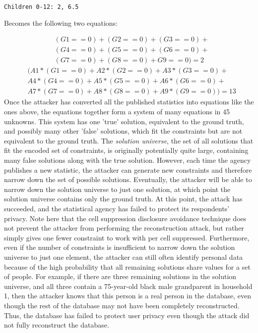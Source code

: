 \documentclass[jou,apacite]{apa6}
\begin{document}
\begin{verbatim}
Children 0-12: 2, 6.5
\end{verbatim}

Becomes the following two equations:

\begin{align*}
& (G1==0) + (G2==0) + (G3==0)+\\
& (G4==0)+  (G5==0) + (G6==0) +\\
& (G7==0) + (G8==0) + G9==0) = 2
\end{align*}
\begin{align*}
& (A1 * (G1==0) + A2 * (G2==0) + A3 * (G3==0) +\\
& A4 * (G4==0) +  A5 * (G5==0) + A6 * (G6==0) + \\
& A7 * (G7==0) + A8 * (G8==0) + A9 * (G9==0)) = 13
\end{align*}
Once the attacker has converted all the published statistics
into equations like the ones above, the equations together form a system of many equations in 45 unknowns. This system has one 'true' solution, equivalent to the
ground truth, and possibly many other 'false' solutions, which fit the constraints but are not equivalent to the ground truth.
The \textit{solution universe}, the set of all solutions that fit the encoded set of constraints, is originally potentially  quite large, containing many false solutions along with the true solution.
However, each time the agency publishes a new statistic, the attacker can generate new constraints and therefore narrow
down the set of possible solutions. Eventually, the attacker
will be able to narrow down the solution universe to just one solution, at which point the solution universe contains only
the ground truth. At this point, the attack has succeeded, and the statistical agency has failed to protect its respondents' privacy. Note here that the cell suppression disclosure avoidance technique does not prevent the attacker from performing the reconstruction attack, but rather simply gives one fewer constraint to work with per cell suppressed.
Furthermore, even if the number of constraints is insufficient to narrow down the solution universe to just one element, the attacker can still often identify personal data because of the high probability that all remaining solutions share values for a set of people. For example, if there are three remaining solutions in the solution universe, and all three contain a 75-year-old black male grandparent in household 1, then the attacker knows that this person is a real person in the database, even though the rest of the database may not have been completely reconstructed. Thus, the database has failed to protect user privacy even though the attack did not fully reconstruct the database.
\end{document}
